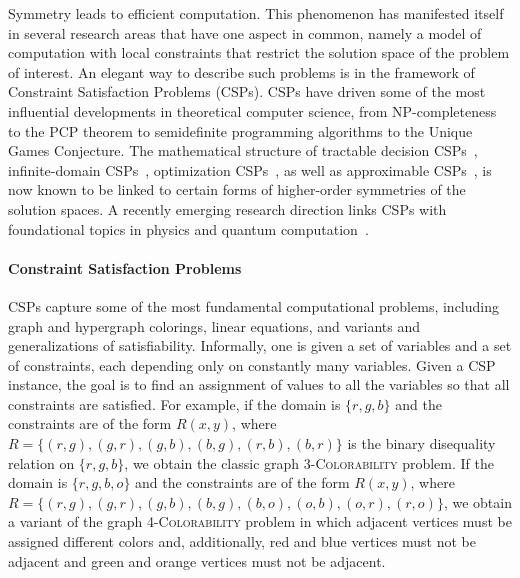 Symmetry leads to efficient computation. This phenomenon has
manifested itself in several research areas that have one aspect in common, namely a
model of computation with local constraints that restrict the solution space of
the problem of interest. An elegant way to describe such problems is in the
framework of Constraint Satisfaction Problems (CSPs).
%
CSPs have driven some of the most influential
developments in theoretical computer science, from NP-completeness to the PCP
theorem to semidefinite programming algorithms to the Unique Games Conjecture.
The mathematical structure of tractable decision
CSPs~\cite{Bulatov17:focs,Zhuk20:jacm}, infinite-domain CSPs~\cite{Bodirsky2021complexity,Bodirsky23:jacm},  optimization CSPs~\cite{tz16:jacm}, as well as approximable
CSPs~\cite{Raghavendra08:everycsp,Brown-CohenRaghavendra15}, is now known to be linked to certain
forms of higher-order symmetries of the solution spaces.
%
A recently emerging research direction links 
CSPs with foundational
topics in physics and quantum
computation~\cite{Cleve14:icalp,Cleve17:jmp-perfect,AKS19:jcss,Paddock23:arxiv,Mancinska20:focs}.

\paragraph{Constraint Satisfaction Problems}
%
CSPs capture some of the most fundamental
computational problems, including graph and hypergraph colorings, linear
equations, and variants and generalizations of satisfiability. Informally, one
is given a set of variables and a set of constraints, each depending only on
constantly many variables. Given a CSP instance, the goal is to find an assignment
of values to all the variables so that all constraints are satisfied. For
example, if the domain is $\{r,g,b\}$ and the constraints are of the form
$R(x,y)$, where $R=\{(r,g),(g,r),(g,b),(b,g),(r,b),(b,r)\}$ is the binary disequality relation on $\{r,g,b\}$, we obtain
the classic graph \textsc{3-Colorability}
problem. If the domain is $\{r,g,b,o\}$ and the
constraints are of the form $R(x,y)$, where
$R=\{(r,g),(g,r),(g,b),(b,g),(b,o),(o,b),(o,r),(r,o)\}$,
we obtain a variant of
the graph \textsc{4-Colorability} problem in which adjacent vertices must be
assigned different colors and, additionally, red and blue vertices must not be adjacent
and green and orange vertices must not be adjacent. 

